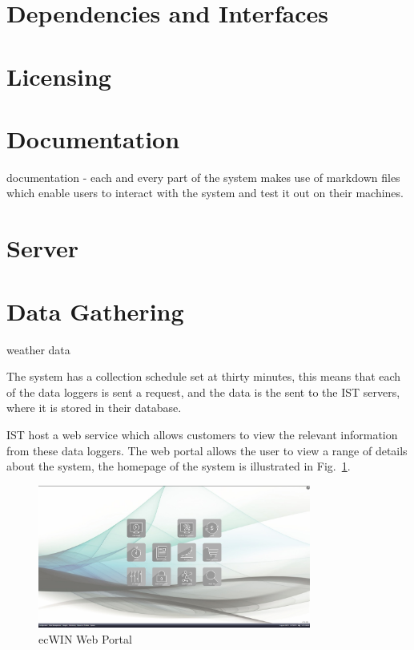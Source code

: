 \documentclass[12pt,onecolumn]{IEEEtran}
\begin{document}
\section{Dependencies and Interfaces} \label{sec:DependenciesInterfaces}


\section{Licensing} \label{sec:Licensing}

\section{Documentation} \label{sec:Documentation}
documentation - each and every part of the system makes use of markdown files which enable users to interact with the system and test it out on their machines. 

\section{Server} \label{sec:Server}
\section{Data Gathering} \label{sec:DataGathering}
weather data

The system has a collection schedule set at thirty minutes, this means that each of the data loggers is sent a request, and the data is the sent to the IST servers, where it is stored in their database. 


IST host a web service which allows customers to view the relevant information from these data loggers. 
The web portal allows the user to view a range of details about the system, the homepage of the system is illustrated in Fig.~\ref{fig:ecwin}.

\begin{center}
    \begin{figure}[htb]
        \centering
        \includegraphics[width=0.8\textwidth]{ecwin.png}
        \caption{ecWIN Web Portal}
        \label{fig:ecwin}
    \end{figure}
\end{center}
\end{document}
